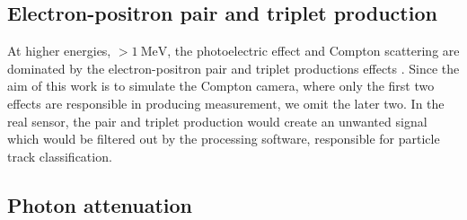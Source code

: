 \documentclass[a4paper,11pt,titlepage,twoside]{book}
\newcommand{\unit}[2]{$#1~\ensuremath{\mathrm{#2}}$}
\begin{document}

\subsection{Electron-positron pair and triplet production}


At higher energies, \unit{>1}{MeV}, the photoelectric effect and Compton scattering are dominated by the electron-positron pair and triplet productions effects \cite{hubbell1980pair}.
Since the aim of this work is to simulate the Compton camera, where only the first two effects are responsible in producing measurement, we omit the later two.
In the real sensor, the pair and triplet production would create an unwanted signal which would be filtered out by the processing software, responsible for particle track classification.


\subsection{Photon attenuation}

\end{document}
